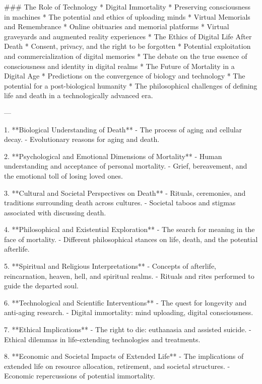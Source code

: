 ### The Role of Technology
   * Digital Immortality
      * Preserving consciousness in machines
      * The potential and ethics of uploading minds
   * Virtual Memorials and Remembrance
      * Online obituaries and memorial platforms
      * Virtual graveyards and augmented reality experiences
   * The Ethics of Digital Life After Death
      * Consent, privacy, and the right to be forgotten
      * Potential exploitation and commercialization of digital memories
      * The debate on the true essence of consciousness and identity in digital realms
   * The Future of Mortality in a Digital Age
      * Predictions on the convergence of biology and technology
      * The potential for a post-biological humanity
      * The philosophical challenges of defining life and death in a technologically advanced era.

---

1. **Biological Understanding of Death**
   - The process of aging and cellular decay.
   - Evolutionary reasons for aging and death.
   
2. **Psychological and Emotional Dimensions of Mortality**
   - Human understanding and acceptance of personal mortality.
   - Grief, bereavement, and the emotional toll of losing loved ones.
   
3. **Cultural and Societal Perspectives on Death**
   - Rituals, ceremonies, and traditions surrounding death across cultures.
   - Societal taboos and stigmas associated with discussing death.
   
4. **Philosophical and Existential Exploration**
   - The search for meaning in the face of mortality.
   - Different philosophical stances on life, death, and the potential afterlife.
   
5. **Spiritual and Religious Interpretations**
   - Concepts of afterlife, reincarnation, heaven, hell, and spiritual realms.
   - Rituals and rites performed to guide the departed soul.
   
6. **Technological and Scientific Interventions**
   - The quest for longevity and anti-aging research.
   - Digital immortality: mind uploading, digital consciousness.
   
7. **Ethical Implications**
   - The right to die: euthanasia and assisted suicide.
   - Ethical dilemmas in life-extending technologies and treatments.
   
8. **Economic and Societal Impacts of Extended Life**
   - The implications of extended life on resource allocation, retirement, and societal structures.
   - Economic repercussions of potential immortality.
   
